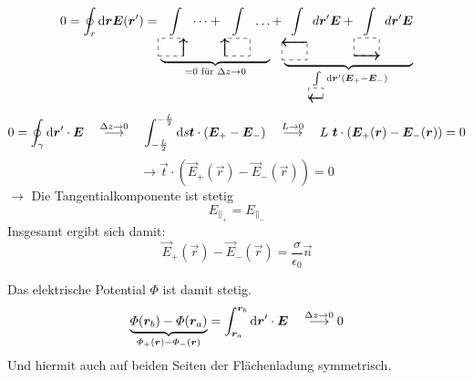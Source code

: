 \begin{equation*}
0 = \oint_r \dd\vec{r} \vec{E}(\vec{r}') = \ub{
	\int\limits_{\begin{tikzpicture}[scale=.7]
		\draw[dashed] (0,0) -- (1,0) -- (1,.7) -- (0,.7) -- (0,0);
		\draw[thick,->] (1,0) -- (1,.7);
		\end{tikzpicture}} \dots + 
	\int\limits_{\begin{tikzpicture}[scale=.7]
		\draw[dashed] (0,0) -- (1,0) -- (1,.7) -- (0,.7) -- (0,0);
		\draw[thick,->] (0,0) -- (0,.7);
		\end{tikzpicture}} \dots}_{= 0 \tx{ für } \Delta z \to 0} + \ub{
	\int\limits_{\begin{tikzpicture}[scale=.7]
		\draw[dashed] (0,0) -- (1,0) -- (1,.7) -- (0,.7) -- (0,0);
		\draw[thick,->] (1,.7) -- (0,.7);
		\end{tikzpicture}} d\vec{r}' \vec{E} + 
	\int\limits_{\begin{tikzpicture}[scale=.7]
		\draw[dashed] (0,0) -- (1,0) -- (1,.7) -- (0,.7) -- (0,0);
		\draw[thick,->] (0,0) -- (1,0);
		\end{tikzpicture}} d\vec{r}' \vec{E} }_{
	\int\limits_{\begin{tikzpicture}[scale=.4]
		\draw[dashed] (0,0) -- (1,0) -- (1,.7) -- (0,.7) -- (0,0);
		\draw[thick,->] (1,0) -- (0,0);
		\end{tikzpicture}} \dd\vec{r}' (\vec{E}_+ -  \vec{E}_-)}
\end{equation*}
\begin{equation*}
0 = \oint_\gamma \dd\vec{r}' \cdot \vec{E} \quad \buildrel \Delta z \to 0 \over \longrightarrow \quad \int_{-\frac{L}{2}}^{-\frac{L}{2}} \dd s \vec{t} \cdot \left(\vec{E}_+ - \vec{E}_-\right) \quad \buildrel L \to 0 \over \longrightarrow \quad L \ \vec{t} \cdot \left(\vec{E}_+(\vec{r}) - \vec{E}_-(\vec{r})\right) = 0
\end{equation*}
\begin{equation*}
\rightarrow \vec{t} \cdot (\vec{E}_+ (\vec{r}) - \vec{E}_- (\vec{r})) = 0
\end{equation*}
$\rightarrow $ Die Tangentialkomponente ist stetig
\begin{equation*}
E_{\parallel_{+}} = E_{\parallel_{-}}
\end{equation*}
Insgesamt ergibt sich damit:
\begin{equation*}
\vec{E}_+(\vec{r}) - \vec{E}_-(\vec{r}) = \frac{\sigma}{\epsilon_0} \vec{n}
\end{equation*}
\begin{minipage}{.6\linewidth}
	Das elektrische Potential $ \Phi $ ist damit stetig.
	\begin{equation*}
	\ub{\Phi(\vec{r}_b) - \Phi(\vec{r}_a)}_{\Phi_+(\vec{r}) - \Phi_-(\vec{r})} = \int_{\vec{r}_a}^{\vec{r}_b} \dd\vec{r}' \cdot \vec{E} \quad \buildrel \Delta z \to 0 \over \longrightarrow 0
	\end{equation*}
	Und hiermit auch auf beiden Seiten der Flächenladung symmetrisch.
\end{minipage}%
